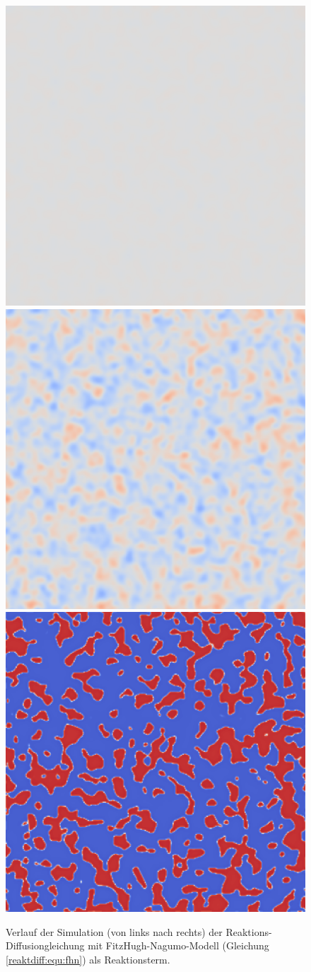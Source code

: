 \begin{figure}
    \centering
    \includegraphics[width=0.32\linewidth]{papers/reaktdiff/images/FitzHughNagumo/fhn_n1.png}
    \includegraphics[width=0.32\linewidth]{papers/reaktdiff/images/FitzHughNagumo/fhn_n300.png}
    \includegraphics[width=0.32\linewidth]{papers/reaktdiff/images/FitzHughNagumo/fhn_n999.png}
    \caption{Verlauf der Simulation (von links nach rechts) der Reaktions-Diffusiongleichung mit FitzHugh-Nagumo-Modell (Gleichung \eqref{reaktdiff:equ:fhn}) als Reaktionsterm.}
    \label{reaktdiff:fig:fhn}
\end{figure}
